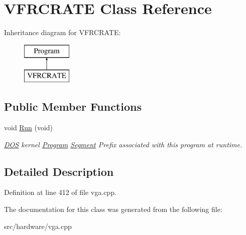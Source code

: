 \hypertarget{classVFRCRATE}{\section{V\-F\-R\-C\-R\-A\-T\-E Class Reference}
\label{classVFRCRATE}
}
Inheritance diagram for V\-F\-R\-C\-R\-A\-T\-E\-:\begin{figure}[H]
\begin{center}
\leavevmode
\includegraphics[height=2.000000cm]{classVFRCRATE}
\end{center}
\end{figure}
\subsection*{Public Member Functions}
\begin{DoxyCompactItemize}
\item 
\hypertarget{classVFRCRATE_ac9e54d65547f248ce6f97a91ebd73db2}{void \hyperlink{classVFRCRATE_ac9e54d65547f248ce6f97a91ebd73db2}{Run} (void)}\label{classVFRCRATE_ac9e54d65547f248ce6f97a91ebd73db2}

\begin{DoxyCompactList}\small\item\em \hyperlink{classDOS}{D\-O\-S} kernel \hyperlink{classProgram}{Program} \hyperlink{structSegment}{Segment} Prefix associated with this program at runtime. \end{DoxyCompactList}\end{DoxyCompactItemize}


\subsection{Detailed Description}


Definition at line 412 of file vga.\-cpp.



The documentation for this class was generated from the following file\-:\begin{DoxyCompactItemize}
\item 
src/hardware/vga.\-cpp\end{DoxyCompactItemize}
